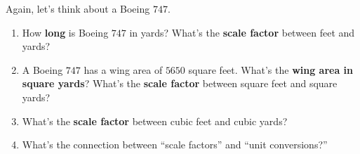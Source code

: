 \documentclass[handout,nooutcomes,noauthor,hints]{ximera}
\begin{document}
\begin{question}
  Again, let's think about a Boeing $747$.
  \begin{enumerate}
  \item How \textbf{long} is Boeing $747$ in yards? What's the \textbf{scale factor} between feet and yards?
  \item A Boeing $747$ has a wing area of $5650$ square feet. What's the
    \textbf{wing area in square yards}? What's the \textbf{scale factor} between square
    feet and square yards?
  \item What's the \textbf{scale factor} between cubic feet and cubic yards?
  \item What's the connection between ``scale factors'' and ``unit conversions?''
  \end{enumerate}
\end{question}
\end{document}
